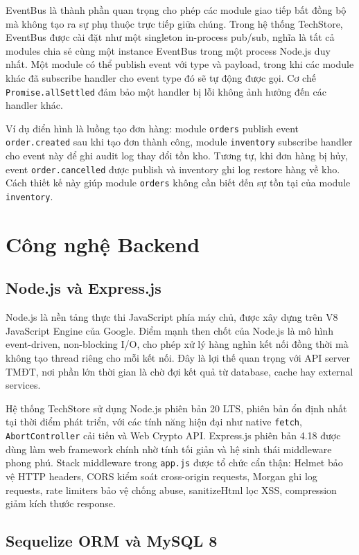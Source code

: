 EventBus là thành phần quan trọng cho phép các module giao tiếp bất đồng bộ mà không tạo ra sự phụ thuộc trực tiếp giữa chúng. Trong hệ thống TechStore, EventBus được cài đặt như một singleton in-process pub/sub, nghĩa là tất cả modules chia sẻ cùng một instance EventBus trong một process Node.js duy nhất. Một module có thể publish event với type và payload, trong khi các module khác đã subscribe handler cho event type đó sẽ tự động được gọi. Cơ chế \texttt{Promise.allSettled} đảm bảo một handler bị lỗi không ảnh hưởng đến các handler khác.

Ví dụ điển hình là luồng tạo đơn hàng: module \texttt{orders} publish event \texttt{order.created} sau khi tạo đơn thành công, module \texttt{inventory} subscribe handler cho event này để ghi audit log thay đổi tồn kho. Tương tự, khi đơn hàng bị hủy, event \texttt{order.cancelled} được publish và inventory ghi log restore hàng về kho. Cách thiết kế này giúp module \texttt{orders} không cần biết đến sự tồn tại của module \texttt{inventory}.

\section{Công nghệ Backend}

\subsection{Node.js và Express.js}

Node.js là nền tảng thực thi JavaScript phía máy chủ, được xây dựng trên V8 JavaScript Engine của Google. Điểm mạnh then chốt của Node.js là mô hình event-driven, non-blocking I/O, cho phép xử lý hàng nghìn kết nối đồng thời mà không tạo thread riêng cho mỗi kết nối. Đây là lợi thế quan trọng với API server TMĐT, nơi phần lớn thời gian là chờ đợi kết quả từ database, cache hay external services.

Hệ thống TechStore sử dụng Node.js phiên bản 20 LTS, phiên bản ổn định nhất tại thời điểm phát triển, với các tính năng hiện đại như native \texttt{fetch}, \texttt{AbortController} cải tiến và Web Crypto API. Express.js phiên bản 4.18 được dùng làm web framework chính nhờ tính tối giản và hệ sinh thái middleware phong phú. Stack middleware trong \texttt{app.js} được tổ chức cẩn thận: Helmet bảo vệ HTTP headers, CORS kiểm soát cross-origin requests, Morgan ghi log requests, rate limiters bảo vệ chống abuse, sanitizeHtml lọc XSS, compression giảm kích thước response.

\subsection{Sequelize ORM và MySQL 8}

